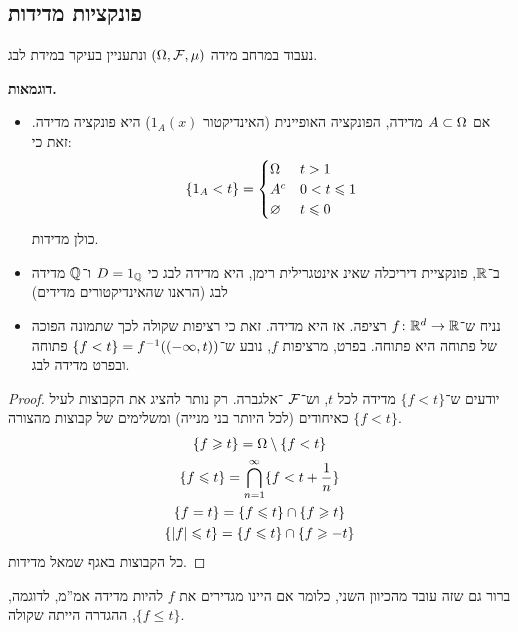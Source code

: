 \documentclass[name=רשימות פונקציות ממשיות – WIP]{../../../tex/classes/noChapterMegasumPreamble}
\newcommand \eqs        {\vspace{-13pt}}
\newcommand\q   {1}
\begin{document}
	\npage
	\section[פונקציות ממשיות מדידות]{}
	\subsection{פונקציות מדידות}
	
	נעבוד במרחב מידה $(\Omega, \mathcal{F}, \mu)$ ונתעניין בעיקר במידת לבג. 
	\defi{תהא $f \co \Og \to \R$. נגדיר $\{f < t\}$ להיות: 
	\[ \{f < t\} \cod \{x \in \Og \co f(x) < t\} = f\op\cl{(-\infty, t)} \]\eqs}
	
	\textbf{דוגמאות. }
	\begin{itemize}
		\item אם $A \subset \Omega$ מדידה, הפונקציה האופיינית (האינדיקטור $\q_A(x)$) היא פונקציה מדידה. זאת כי: 
		\[ \{1_A < t\} = \begin{cases}
			\Omega & t > 1 \\
			A^{c} & 0 < t \leqslant 1 \\
			\varnothing & t \leqslant 0
		\end{cases} \]
		כולן מדידות. 
		\item ב־$\mathbb{R}$, פונקציית דיריכלה שאינ אינטגרילית רימן, היא מדידה לבג כי $D = \q_\Q$ ו־$\mathbb{Q}$ מדידה לבג (הראנו שהאינדיקטורים מדידים)
		\item נניח ש־$f \colon \mathbb{R}^{d} \to \mathbb{R}$ רציפה. אז היא מדידה. זאת כי רציפות שקולה לכך שתמונה הפוכה של פתוחה היא פתוחה. בפרט, מרציפות $f$, נובע ש־$\{f < t\} = f^{-1}((-\infty, t))$ פתוחה ובפרט מדידה לבג. 
	\end{itemize}
	\begin{proof}
		יודעים ש־$\{f < t\}$ מדידה לכל $t$, וש־$\mathcal{F}$ \ס־אלגברה. רק נותר להציג את הקבוצות לעיל כאיחודים (לכל היותר בני מנייה) ומשלימים של קבוצות מהצורה $\{f < t\}$. 
		\begin{gather*}
			\{f \geqslant t\} = \Omega \setminus \{f < t\} \\
			\{f \leqslant t\} = \bigcap_{n = 1}^{\infty}\{f < t + \frac{1}{n}\} \\
			\{f = t\} = \{f \leqslant t\} \cap \{f \geqslant t\} \\
			\{\left \lvert f \right \rvert \leqslant t\} = \{f \leqslant t\} \cap \{f \geqslant -t\}
		\end{gather*}
		כל הקבוצות באגף שמאל מדידות. 
	\end{proof}
	ברור גם שזה עובד מהכיוון השני, כלומר אם היינו מגדירים את $f$ להיות מדידה אמ''מ, לדוגמה, $\{f \le t\}$, ההגדרה הייתה שקולה. 
	
\end{document}
